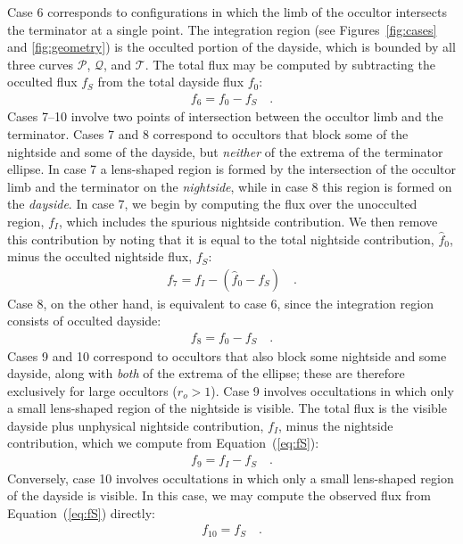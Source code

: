 \documentclass[modern]{aastex62}
\begin{document}
Case 6 corresponds to configurations in which the limb of the occultor
intersects the terminator at a single point. The integration region
(see Figures~\ref{fig:cases} and \ref{fig:geometry}) is the occulted
portion of the dayside, which is bounded by all three curves $\mathcal{P}$, $\mathcal{Q}$, and $\mathcal{T}$.
The total flux may
be computed by subtracting the occulted flux $f_S$ from the total dayside
flux $f_0$:
%
\begin{align}
    \label{eq:f6}
    f_6 = f_0 - f_S
    \quad.
\end{align}
%
Cases 7--10 involve two points of intersection between the occultor limb and
the terminator.
%
Cases 7 and 8 correspond to occultors that block some of the
nightside and some of the dayside, but \emph{neither} of the extrema of the
terminator ellipse. In case 7 a lens-shaped region is formed by the
intersection of the occultor limb and the terminator on the
\emph{nightside}, while in case 8 this region is formed on the \emph{dayside}.
%
In case 7, we begin by computing the
flux over the unocculted region, $f_I$, which includes the spurious
nightside contribution. We then remove this contribution by noting that it
is equal to the total nightside contribution, $\hat{f}_0$, minus the
occulted nightside flux, $f_S$:
%
\begin{align}
    \label{eq:f7}
    f_7 = f_I - (\hat{f}_0 - f_S)
    \quad.
\end{align}
%
Case 8, on the other hand, is equivalent to case 6, since
the integration region consists of occulted dayside:
%
\begin{align}
    \label{eq:f8}
    f_8 = f_0 - f_S
    \quad.
\end{align}
%
Cases 9 and 10 correspond to occultors that also block some nightside and some
dayside, along with \emph{both} of the extrema of the ellipse; these are
therefore exclusively for large occultors ($r_o > 1$). Case 9
involves occultations in which only a small lens-shaped region of the
nightside is visible. The total flux is the visible dayside plus unphysical
nightside contribution, $f_I$, minus the nightside contribution, which we
compute from Equation~(\ref{eq:fS}):
%
\begin{align}
    \label{eq:f9}
    f_9 = f_I - f_S
    \quad.
\end{align}
%
Conversely, case 10 involves occultations in which only a small lens-shaped
region of the dayside is visible. In this case, we may compute the observed
flux from Equation~(\ref{eq:fS}) directly:
%
\begin{align}
    \label{eq:f10}
    f_{10} = f_S
    \quad.
\end{align}
%
\end{document}
